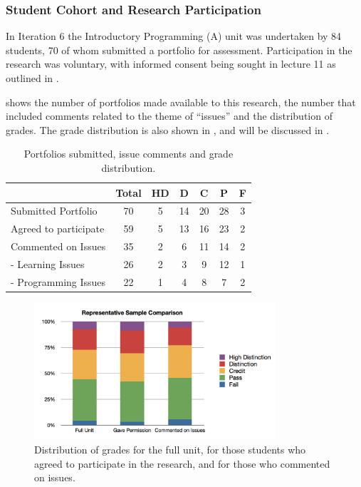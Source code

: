 \subsubsection{Student Cohort and Research Participation} %
\label{sub:issues_student_cohort}

In Iteration 6 the Introductory Programming (A) unit was undertaken by 84 students, 70 of whom submitted a portfolio for assessment. Participation in the research was voluntary, with informed consent being sought in lecture 11 as outlined in .

 shows the number of portfolios made available to this research, the number that included comments related to the theme of ``issues'' and the distribution of grades. The grade distribution is also shown in , and will be discussed in .

\begin{table}[p]
	\footnotesize
	\renewcommand{\arraystretch}{1.3}
	\caption{Portfolios submitted, issue comments and grade distribution.}
	\label{tbl:issues_student_numbers}
	\centering
	\begin{tabular}{l|c|c|c|c|c|c}
        ~                     & Total & HD & D & C & P & F  \\ \hline
        Submitted Portfolio   & 70    & 5                & 14          & 20     & 28   & 3     \\ %
        Agreed to participate & 59    & 5                & 13          & 16     & 23   & 2     \\ %
        Commented on Issues   & 35    & 2                & 6           & 11     & 14   & 2     \\ 
         - Learning Issues    & 26    & 2                & 3           & 9     & 12   & 1     \\ 
         - Programming Issues & 22    & 1                & 4           & 8     & 7   & 2     \\
	\end{tabular}
\end{table}

\begin{figure}[thbp]
	\centering
	\includegraphics[width=0.8\textwidth]{IssuesGradeDistributions}
	\caption{Distribution of grades for the full unit, for those students who agreed to participate in the research, and for those who commented on issues.}
	\label{fig:issues_grade_dist}
\end{figure}



